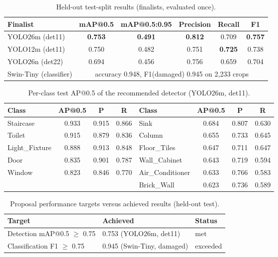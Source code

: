 \begin{table}[htbp]
\centering
\caption{Held-out test-split results (finalists, evaluated once).}
\label{tab:test}
\begin{tabular}{lccccc}
\hline
Finalist & mAP@0.5 & mAP@0.5:0.95 & Precision & Recall & F1 \\
\hline
YOLO26m (det11) & \textbf{0.753} & \textbf{0.491} & \textbf{0.812} & 0.709 & \textbf{0.757} \\
YOLO12m (det11) & 0.750 & 0.482 & 0.751 & \textbf{0.725} & 0.738 \\
YOLO26n (det22) & 0.694 & 0.456 & 0.756 & 0.659 & 0.704 \\
\hline
Swin-Tiny (classifier) & \multicolumn{5}{c}{accuracy 0.948, F1(damaged) 0.945 on 2{,}233 crops} \\
\hline
\end{tabular}
\end{table}

\begin{table}[htbp]
\centering
\caption{Per-class test AP@0.5 of the recommended detector (YOLO26m, det11).}
\label{tab:per-class}
\begin{tabular}{lccc|lccc}
\hline
Class & AP@0.5 & P & R & Class & AP@0.5 & P & R \\
\hline
Staircase & 0.933 & 0.915 & 0.866 & Sink & 0.684 & 0.807 & 0.630 \\
Toilet & 0.915 & 0.879 & 0.836 & Column & 0.655 & 0.733 & 0.645 \\
Light\_Fixture & 0.888 & 0.913 & 0.848 & Floor\_Tiles & 0.647 & 0.711 & 0.647 \\
Door & 0.835 & 0.901 & 0.787 & Wall\_Cabinet & 0.643 & 0.719 & 0.594 \\
Window & 0.823 & 0.846 & 0.770 & Air\_Conditioner & 0.633 & 0.766 & 0.583 \\
 & & & & Brick\_Wall & 0.623 & 0.736 & 0.589 \\
\hline
\end{tabular}
\end{table}

\begin{table}[htbp]
\centering
\caption{Proposal performance targets versus achieved results (held-out test).}
\label{tab:targets}
\begin{tabular}{lll}
\hline
Target & Achieved & Status \\
\hline
Detection mAP@0.5 $\geq$ 0.75 & 0.753 (YOLO26m, det11) & met \\
Classification F1 $\geq$ 0.75 & 0.945 (Swin-Tiny, damaged) & exceeded \\
\hline
\end{tabular}
\end{table}
